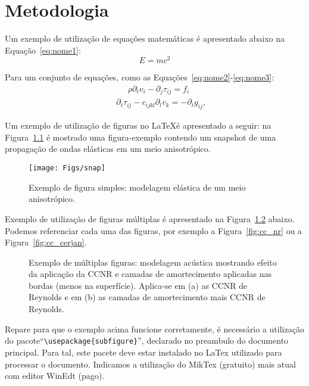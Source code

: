 \chapter{Metodologia}

Um exemplo de utilização de equações matemáticas é apresentado abaixo na Equação~\ref{eq:nome1}:
\begin{equation}
\label{eq:nome1}E=mc^2
\end{equation}

Para um conjunto de equações, como as Equações~\ref{eq:nome2}-\ref{eq:nome3}:
\begin{eqnarray}
\label{eq:nome2} & & \;\;\;\;\; \rho \partial_t v_i
 - \partial_j \tau_{ij} = f_i\\
\label{eq:nome3} & &
\partial_t \tau_{ij}-c_{ijkl}\partial_l v_{k}=-\partial_tg_{ij},
\end{eqnarray}


Um exemplo de utilização de figuras no \LaTeX é apresentado a seguir: na
Figura~\ref{fig:caption1} é mostrado uma figura-exemplo contendo um snapshot
de uma propagação de ondas elásticas em um meio anisotrópico.
\begin{figure}[hbt]
\centering \texttt{[image: Figs/snap]}
\caption[Exemplo de figura simples (texto do índice).]{Exemplo de figura simples:
modelagem elástica de um meio anisotrópico.}
\label{fig:caption1}
\end{figure}

Exemplo de utilização de figuras múltiplas é apresentado na Figura~\ref{fig:cc}
abaixo. Podemos referenciar cada uma das figuras, por exemplo a Figura~\ref{fig:cc_nr} ou
a Figura~\ref{fig:cc_cerjan}.
\begin{figure}[hbt]
\centering {} \qquad {}
\caption[Exemplo de múltiplas figuras (texto do índice).]{Exemplo de múltiplas
figuras: modelagem
acústica mostrando efeito da aplicação da CCNR e camadas de amortecimento
aplicadas nas bordas (menos na superfície). Aplica-se em (a) as CCNR de
Reynolds e em (b) as camadas de amortecimento mais CCNR de Reynolds.}
\label{fig:cc}
\end{figure}

Repare para que o exemplo acima funcione corretamente, é necessário a utilização do pacote``\verb|\usepackage{subfigure}|'', declarado no preambulo do documento principal. Para tal, este pacete deve estar instalado no LaTex utilizado para processar o documento. Indicamos a utilização do MikTex (gratuito) mais atual com editor WinEdt (pago).